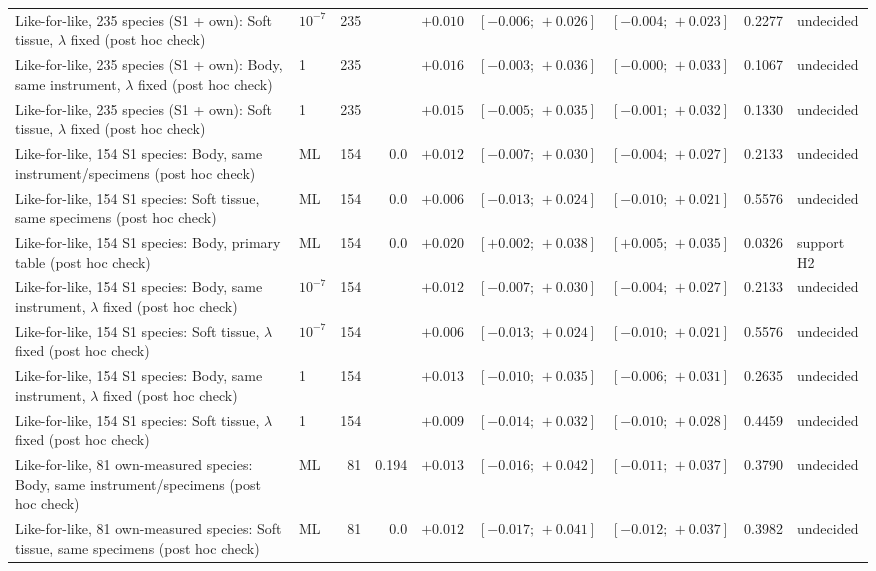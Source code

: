 \begin{table}
\begin{tabular}{@{}>{\raggedright\arraybackslash}p{10.6cm}lrrrccrl@{}}
Like-for-like, 235 species (S1 + own): Soft tissue, $\lambda$ fixed (post hoc check) & $10^{-7}$ & 235 &  & $+0.010$ & $[-0.006;\,+0.026]$ & $[-0.004;\,+0.023]$ & 0.2277 & undecided \\
Like-for-like, 235 species (S1 + own): Body, same instrument, $\lambda$ fixed (post hoc check) & 1 & 235 &  & $+0.016$ & $[-0.003;\,+0.036]$ & $[-0.000;\,+0.033]$ & 0.1067 & undecided \\
Like-for-like, 235 species (S1 + own): Soft tissue, $\lambda$ fixed (post hoc check) & 1 & 235 &  & $+0.015$ & $[-0.005;\,+0.035]$ & $[-0.001;\,+0.032]$ & 0.1330 & undecided \\
\midrule
Like-for-like, 154 S1 species: Body, same instrument/specimens (post hoc check) & ML & 154 & 0.0 & $+0.012$ & $[-0.007;\,+0.030]$ & $[-0.004;\,+0.027]$ & 0.2133 & undecided \\
Like-for-like, 154 S1 species: Soft tissue, same specimens (post hoc check) & ML & 154 & 0.0 & $+0.006$ & $[-0.013;\,+0.024]$ & $[-0.010;\,+0.021]$ & 0.5576 & undecided \\
Like-for-like, 154 S1 species: Body, primary table (post hoc check) & ML & 154 & 0.0 & $+0.020$ & $[+0.002;\,+0.038]$ & $[+0.005;\,+0.035]$ & 0.0326 & support H2 \\
Like-for-like, 154 S1 species: Body, same instrument, $\lambda$ fixed (post hoc check) & $10^{-7}$ & 154 &  & $+0.012$ & $[-0.007;\,+0.030]$ & $[-0.004;\,+0.027]$ & 0.2133 & undecided \\
Like-for-like, 154 S1 species: Soft tissue, $\lambda$ fixed (post hoc check) & $10^{-7}$ & 154 &  & $+0.006$ & $[-0.013;\,+0.024]$ & $[-0.010;\,+0.021]$ & 0.5576 & undecided \\
Like-for-like, 154 S1 species: Body, same instrument, $\lambda$ fixed (post hoc check) & 1 & 154 &  & $+0.013$ & $[-0.010;\,+0.035]$ & $[-0.006;\,+0.031]$ & 0.2635 & undecided \\
Like-for-like, 154 S1 species: Soft tissue, $\lambda$ fixed (post hoc check) & 1 & 154 &  & $+0.009$ & $[-0.014;\,+0.032]$ & $[-0.010;\,+0.028]$ & 0.4459 & undecided \\
\midrule
Like-for-like, 81 own-measured species: Body, same instrument/specimens (post hoc check) & ML & 81 & 0.194 & $+0.013$ & $[-0.016;\,+0.042]$ & $[-0.011;\,+0.037]$ & 0.3790 & undecided \\
Like-for-like, 81 own-measured species: Soft tissue, same specimens (post hoc check) & ML & 81 & 0.0 & $+0.012$ & $[-0.017;\,+0.041]$ & $[-0.012;\,+0.037]$ & 0.3982 & undecided \\

\end{tabular}
\end{table}
